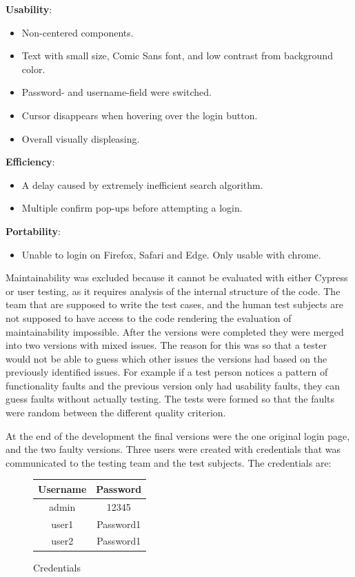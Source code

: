 \documentclass[journal,twocolumn]{IEEEtran}
\begin{document}
\textbf{Usability}:
\begin{itemize}
    \item Non-centered components.
    \item Text with small size, Comic Sans font, and low contrast from background color.
    \item Password- and username-field were switched.
    \item Cursor disappears when hovering over the login button.
    \item Overall visually displeasing.
\end{itemize}

\textbf{Efficiency}:
\begin{itemize}
    \item A delay caused by extremely inefficient search algorithm.
    \item Multiple confirm pop-ups before attempting a login.
\end{itemize}

\textbf{Portability}:
\begin{itemize}
    \item Unable to login on Firefox, Safari and Edge. Only usable with chrome.
\end{itemize}

Maintainability was excluded because it cannot be evaluated with either Cypress or user testing, as it requires analysis of the internal structure of the code. The team that are supposed to write the test cases, and the human test subjects are not supposed to have access to the code rendering the evaluation of maintainability impossible. After the versions were completed they were merged into two versions with mixed issues. The reason for this was so that a tester would not be able to guess which other issues the versions had based on the previously identified issues. For example if a test person notices a pattern of functionality faults and the previous version only had usability faults, they can guess faults without actually testing. The tests were formed so that the faults were random between the different quality criterion.

At the end of the development the final versions were the one original login page, and the two faulty versions. Three users were created with credentials that was communicated to the testing team and the test subjects. The credentials are:

\begin{figure}[h!]
    \centering
    \begin{tabular}{|c|c|}
        \hline
        \textbf{Username} & \textbf{Password} \\ \hline
        admin             & 12345             \\ \hline
        user1             & Password1         \\ \hline
        user2             & Password1         \\ \hline
    \end{tabular}
    \caption{Credentials}
\end{figure}
\end{document}
